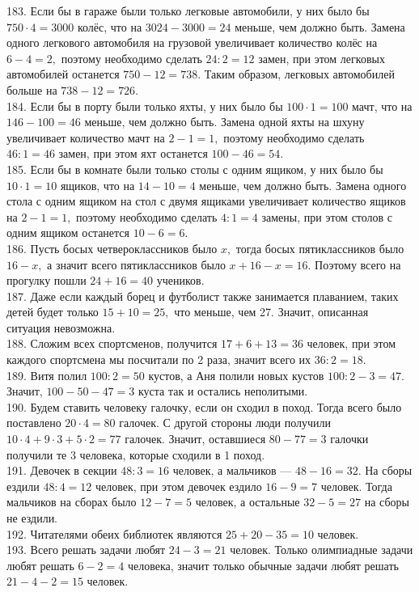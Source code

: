 \documentclass[12pt]{article}
\begin{document}
183. Если бы в гараже были только легковые автомобили, у них было бы $750\cdot4=3000$ колёс, что на $3024-3000=24$ меньше, чем должно быть. Замена одного легкового автомобиля на грузовой увеличивает количество колёс на $6-4=2,$ поэтому необходимо сделать $24:2=12$ замен, при этом легковых автомобилей останется $750-12=738.$ Таким образом, легковых автомобилей больше на $738-12=726.$\\
184. Если бы в порту были только яхты, у них было бы $100\cdot1=100$ мачт, что на $146-100=46$ меньше, чем должно быть. Замена одной яхты на шхуну увеличивает количество мачт на $2-1=1,$ поэтому необходимо сделать $46:1=46$ замен, при этом яхт останется $100-46=54.$\\
185. Если бы в комнате были только столы с одним ящиком, у них было бы $10\cdot1=10$ ящиков, что на $14-10=4$ меньше, чем должно быть. Замена одного стола с одним ящиком на стол с двумя ящиками увеличивает количество ящиков на $2-1=1,$ поэтому необходимо сделать $4:1=4$ замены, при этом столов с одним ящиком останется $10-6=6.$\\
186. Пусть босых четвероклассников было $x,$ тогда босых пятиклассников было $16-x,$ а значит всего пятиклассников было $x+16-x=16.$ Поэтому всего на прогулку пошли $24+16=40$ учеников.\\
187. Даже если каждый борец и футболист также занимается плаванием, таких детей будет только $15+10=25,$ что меньше, чем 27. Значит, описанная ситуация невозможна.\\
188. Сложим всех спортсменов, получится $17+6+13=36$ человек, при этом каждого спортсмена мы посчитали по 2 раза, значит всего их $36:2=18.$\\
189. Витя полил $100:2=50$ кустов, а Аня полили новых кустов $100:2-3=47.$ Значит, $100-50-47=3$ куста так и остались неполитыми.\\
190. Будем ставить человеку галочку, если он сходил в поход. Тогда всего было поставлено $20\cdot4=80$ галочек. С другой стороны люди получили $10\cdot4+9\cdot3+5\cdot2=77$ галочек. Значит, оставшиеся $80-77=3$ галочки получили те 3 человека, которые сходили в 1 поход.\\
191. Девочек в секции $48:3=16$ человек, а мальчиков --- $48-16=32.$ На сборы ездили $48:4=12$ человек, при этом девочек ездило $16-9=7$ человек. Тогда мальчиков на сборах было $12-7=5$ человек, а остальные $32-5=27$ на сборы не ездили.\\
192. Читателями обеих библиотек являются $25+20-35=10$ человек.\\
193. Всего решать задачи любят $24-3=21$ человек. Только олимпиадные задачи любят решать $6-2=4$ человека, значит только обычные задачи любят решать $21-4-2=15$ человек.\\
\end{document}
